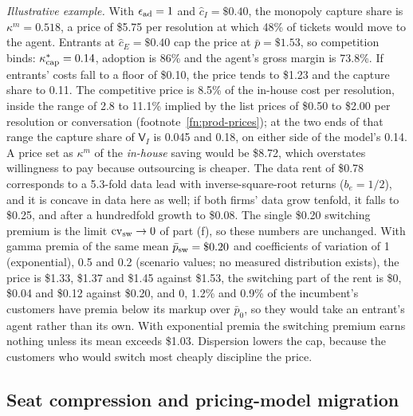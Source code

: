 \noindent\emph{Illustrative example.} With $\epsilon_{\rm ad}=1$ and $\hat c_I=\$0.40$, the monopoly capture share is $\kappa^m=0.518$, a price of \$5.75 per resolution at which 48\% of tickets would move to the agent. Entrants at $\hat c_E=\$0.40$ cap the price at $\bar p=\$1.53$, so competition binds: $\kappa^*_{\rm cap}=0.14$, adoption is 86\% and the agent's gross margin is 73.8\%. If entrants' costs fall to a floor of \$0.10, the price tends to \$1.23 and the capture share to 0.11. The competitive price is 8.5\% of the in-house cost per resolution, inside the range of 2.8 to 11.1\% implied by the list prices of \$0.50 to \$2.00 per resolution or conversation (footnote~\ref{fn:prod-prices}); at the two ends of that range the capture share of $\mathsf V_I$ is 0.045 and 0.18, on either side of the model's 0.14. A price set as $\kappa^m$ of the \emph{in-house} saving would be \$8.72, which overstates willingness to pay because outsourcing is cheaper. The data rent of \$0.78 corresponds to a 5.3-fold data lead with inverse-square-root returns ($b_e=1/2$), and it is concave in data here as well; if both firms' data grow tenfold, it falls to \$0.25, and after a hundredfold growth to \$0.08. The single \$0.20 switching premium is the limit $\mathrm{cv}_{\rm sw}\to 0$ of part (f), so these numbers are unchanged. With gamma premia of the same mean $\bar p_{\rm sw}=\$0.20$ and coefficients of variation of 1 (exponential), 0.5 and 0.2 (scenario values; no measured distribution exists), the price is \$1.33, \$1.37 and \$1.45 against \$1.53, the switching part of the rent is \$0, \$0.04 and \$0.12 against \$0.20, and 0, 1.2\% and 0.9\% of the incumbent's customers have premia below its markup over $\bar p_0$, so they would take an entrant's agent rather than its own. With exponential premia the switching premium earns nothing unless its mean exceeds \$1.03. Dispersion lowers the cap, because the customers who would switch most cheaply discipline the price.

\subsection{Seat compression and pricing-model migration}\label{sec:product-seats}

